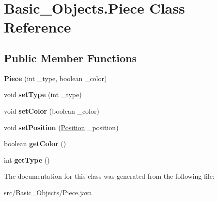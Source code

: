 \hypertarget{class_basic___objects_1_1_piece}{\section{Basic\-\_\-\-Objects.\-Piece Class Reference}
\label{class_basic___objects_1_1_piece}
}
\subsection*{Public Member Functions}
\begin{DoxyCompactItemize}
\item 
\hypertarget{class_basic___objects_1_1_piece_a8a77d01c5f20edfba9c6a6b7a329ca74}{{\bfseries Piece} (int \-\_\-type, boolean \-\_\-color)}\label{class_basic___objects_1_1_piece_a8a77d01c5f20edfba9c6a6b7a329ca74}

\item 
\hypertarget{class_basic___objects_1_1_piece_a913fe893938642e2634b299289236167}{void {\bfseries set\-Type} (int \-\_\-type)}\label{class_basic___objects_1_1_piece_a913fe893938642e2634b299289236167}

\item 
\hypertarget{class_basic___objects_1_1_piece_af5455dcbe84c08a0afe7ab8cf56add21}{void {\bfseries set\-Color} (boolean \-\_\-color)}\label{class_basic___objects_1_1_piece_af5455dcbe84c08a0afe7ab8cf56add21}

\item 
\hypertarget{class_basic___objects_1_1_piece_a9e5be2fca010d89ecb6dfaf91a0eb058}{void {\bfseries set\-Position} (\hyperlink{class_basic___objects_1_1_position}{Position} \-\_\-position)}\label{class_basic___objects_1_1_piece_a9e5be2fca010d89ecb6dfaf91a0eb058}

\item 
\hypertarget{class_basic___objects_1_1_piece_a64f78783deb89a041d344bfb9d0b3d0a}{boolean {\bfseries get\-Color} ()}\label{class_basic___objects_1_1_piece_a64f78783deb89a041d344bfb9d0b3d0a}

\item 
\hypertarget{class_basic___objects_1_1_piece_acc2175d2a0d7772d5c5f42dd77a816fc}{int {\bfseries get\-Type} ()}\label{class_basic___objects_1_1_piece_acc2175d2a0d7772d5c5f42dd77a816fc}

\end{DoxyCompactItemize}


The documentation for this class was generated from the following file\-:\begin{DoxyCompactItemize}
\item 
src/\-Basic\-\_\-\-Objects/Piece.\-java\end{DoxyCompactItemize}

